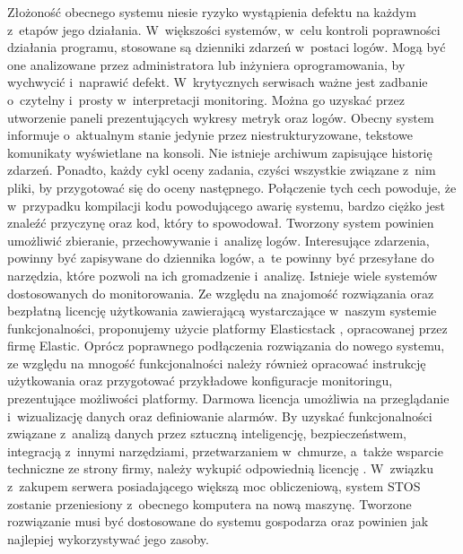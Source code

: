 \newline \indent Złożoność obecnego systemu niesie ryzyko wystąpienia defektu na każdym z~etapów jego działania. W~większości systemów, w~celu kontroli poprawności działania programu, stosowane są dzienniki zdarzeń w~postaci logów. Mogą być one analizowane przez administratora lub inżyniera oprogramowania, by wychwycić i~naprawić defekt. W~krytycznych serwisach ważne jest zadbanie o~czytelny i~prosty w~interpretacji monitoring. Można go uzyskać przez utworzenie paneli prezentujących wykresy metryk oraz logów. Obecny system informuje o~aktualnym stanie jedynie przez niestrukturyzowane, tekstowe komunikaty wyświetlane na konsoli. Nie istnieje archiwum zapisujące historię zdarzeń. Ponadto, każdy cykl oceny zadania, czyści wszystkie związane z~nim pliki, by przygotować się do oceny następnego. Połączenie tych cech powoduje, że w~przypadku kompilacji kodu powodującego awarię systemu, bardzo ciężko jest znaleźć przyczynę oraz kod, który to spowodował. Tworzony system powinien umożliwić zbieranie, przechowywanie i~analizę logów. Interesujące zdarzenia, powinny być zapisywane do dziennika logów, a~te powinny być przesyłane do narzędzia, które pozwoli na ich gromadzenie i~analizę. Istnieje wiele systemów dostosowanych do monitorowania. Ze względu na znajomość rozwiązania oraz bezpłatną licencję użytkowania zawierającą wystarczające w~naszym systemie funkcjonalności, proponujemy użycie platformy Elasticstack \cite{elastic}, opracowanej przez firmę Elastic. Oprócz poprawnego podłączenia rozwiązania do nowego systemu, ze względu na mnogość funkcjonalności należy również opracować instrukcję użytkowania oraz przygotować przykładowe konfiguracje monitoringu, prezentujące możliwości platformy. Darmowa licencja umożliwia na przeglądanie i~wizualizację danych oraz definiowanie alarmów. By uzyskać funkcjonalności związane z~analizą danych przez sztuczną inteligencję, bezpieczeństwem, integracją z~innymi narzędziami, przetwarzaniem w~chmurze, a~także wsparcie techniczne ze strony firmy, należy wykupić odpowiednią licencję \cite{elasticLicencje}.
\newline \indent W~związku z~zakupem serwera posiadającego większą moc obliczeniową, system STOS zostanie przeniesiony z~obecnego komputera na nową maszynę. Tworzone rozwiązanie musi być dostosowane do systemu gospodarza oraz powinien jak najlepiej wykorzystywać jego zasoby.
